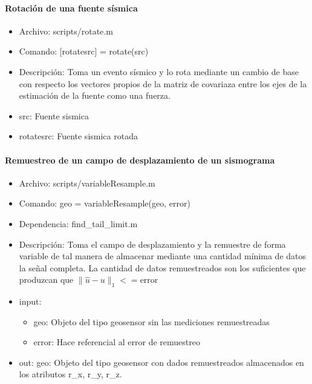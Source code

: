 \paragraph{Rotación de una fuente sísmica}
\begin{itemize}
  \item Archivo: scripts/rotate.m
  \item Comando: [rotatesrc] = rotate(src)
  \item Descripción: Toma un evento sísmico y lo rota mediante un cambio de base
  con respecto los vectores propios de la matriz de covariaza entre los ejes de
  la estimación de la fuente como una fuerza.
  \item src: Fuente sismica
  \item rotatesrc: Fuente sismica rotada
\end{itemize}


\paragraph{Remuestreo de un campo de desplazamiento de un sismograma}
\begin{itemize}
  \item Archivo: scripts/variableResample.m
  \item Comando: geo = variableResample(geo, error)
  \item Dependencia: find\_tail\_limit.m
  \item Descripción: Toma el campo de desplazamiento y la remuestre de forma
  variable de tal manera de almacenar mediante una cantidad mínima de datos la
  señal completa. La cantidad de datos remuestreados son los suficientes que
  produzcan que $\|\hat{u} - u\|_1<=\text{error}$
  \item input:
  \begin{itemize}
    \item geo: Objeto del tipo geosensor sin las mediciones remuestreadas
    \item error: Hace referencial al error de remuestreo
  \end{itemize}
  \item out: geo: Objeto del tipo geosensor con dados remuestreados almacenados
  en los atributos r\_x, r\_y, r\_z.
\end{itemize}


